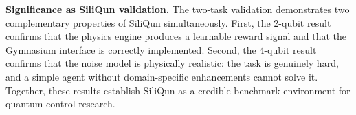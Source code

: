 \textbf{Significance as SiliQun validation.}
The two-task validation demonstrates two complementary properties of SiliQun
simultaneously.
First, the 2-qubit result confirms that the physics engine produces a learnable
reward signal and that the Gymnasium interface is correctly implemented.
Second, the 4-qubit result confirms that the noise model is physically realistic:
the task is genuinely hard, and a simple agent without domain-specific
enhancements cannot solve it.
Together, these results establish SiliQun as a credible benchmark environment
for quantum control research.

